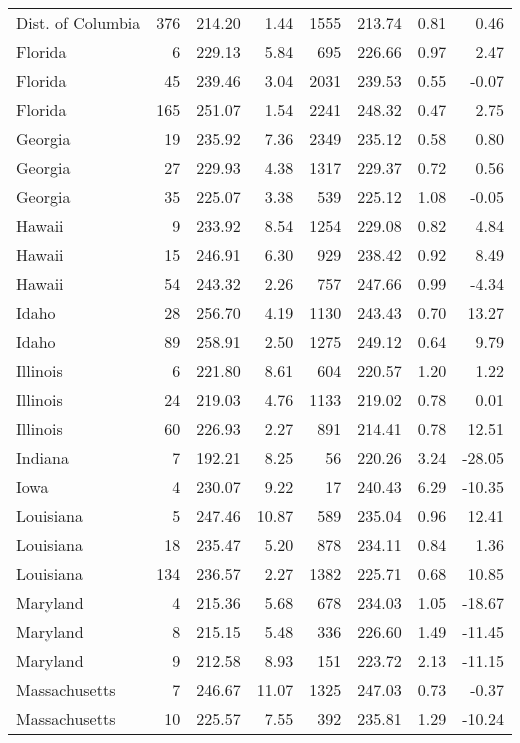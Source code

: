 \begin{longtable}{lrrr@{\extracolsep{10pt}}rrrr}
  Dist. of Columbia & 376 & 214.20 & 1.44 & 1555 & 213.74 & 0.81 & 0.46 \\ 
  Florida &   6 & 229.13 & 5.84 & 695 & 226.66 & 0.97 & 2.47 \\ 
  Florida &  45 & 239.46 & 3.04 & 2031 & 239.53 & 0.55 & -0.07 \\ 
  Florida & 165 & 251.07 & 1.54 & 2241 & 248.32 & 0.47 & 2.75 \\ 
  Georgia &  19 & 235.92 & 7.36 & 2349 & 235.12 & 0.58 & 0.80 \\ 
  Georgia &  27 & 229.93 & 4.38 & 1317 & 229.37 & 0.72 & 0.56 \\ 
  Georgia &  35 & 225.07 & 3.38 & 539 & 225.12 & 1.08 & -0.05 \\ 
  Hawaii &   9 & 233.92 & 8.54 & 1254 & 229.08 & 0.82 & 4.84 \\ 
  Hawaii &  15 & 246.91 & 6.30 & 929 & 238.42 & 0.92 & 8.49 \\ 
  Hawaii &  54 & 243.32 & 2.26 & 757 & 247.66 & 0.99 & -4.34 \\ 
  Idaho &  28 & 256.70 & 4.19 & 1130 & 243.43 & 0.70 & 13.27 \\ 
  Idaho &  89 & 258.91 & 2.50 & 1275 & 249.12 & 0.64 & 9.79 \\ 
  Illinois &   6 & 221.80 & 8.61 & 604 & 220.57 & 1.20 & 1.22 \\ 
  Illinois &  24 & 219.03 & 4.76 & 1133 & 219.02 & 0.78 & 0.01 \\ 
  Illinois &  60 & 226.93 & 2.27 & 891 & 214.41 & 0.78 & 12.51 \\ 
  Indiana &   7 & 192.21 & 8.25 &  56 & 220.26 & 3.24 & -28.05 \\ 
  Iowa &   4 & 230.07 & 9.22 &  17 & 240.43 & 6.29 & -10.35 \\ 
  Louisiana &   5 & 247.46 & 10.87 & 589 & 235.04 & 0.96 & 12.41 \\ 
  Louisiana &  18 & 235.47 & 5.20 & 878 & 234.11 & 0.84 & 1.36 \\ 
  Louisiana & 134 & 236.57 & 2.27 & 1382 & 225.71 & 0.68 & 10.85 \\ 
  Maryland &   4 & 215.36 & 5.68 & 678 & 234.03 & 1.05 & -18.67 \\ 
  Maryland &   8 & 215.15 & 5.48 & 336 & 226.60 & 1.49 & -11.45 \\ 
  Maryland &   9 & 212.58 & 8.93 & 151 & 223.72 & 2.13 & -11.15 \\ 
  Massachusetts &   7 & 246.67 & 11.07 & 1325 & 247.03 & 0.73 & -0.37 \\ 
  Massachusetts &  10 & 225.57 & 7.55 & 392 & 235.81 & 1.29 & -10.24 \\ 

\end{longtable}
